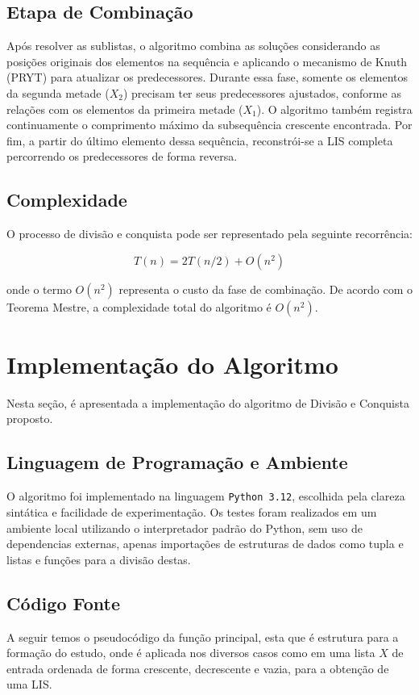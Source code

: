\documentclass[por]{ajceam-class}
\begin{document}
\subsection{Etapa de Combinação}

Após resolver as sublistas, o algoritmo combina as soluções considerando as posições originais dos elementos na sequência e aplicando o mecanismo de Knuth (PRYT) para atualizar os predecessores.  
Durante essa fase, somente os elementos da segunda metade ($X_2$) precisam ter seus predecessores ajustados, conforme as relações com os elementos da primeira metade ($X_1$).  
O algoritmo também registra continuamente o comprimento máximo da subsequência crescente encontrada.  
Por fim, a partir do último elemento dessa sequência, reconstrói-se a LIS completa percorrendo os predecessores de forma reversa.

\subsection{Complexidade}

O processo de divisão e conquista pode ser representado pela seguinte recorrência:

\[
T(n) = 2T(n/2) + O(n^2)
\]

onde o termo $O(n^2)$ representa o custo da fase de combinação.  
De acordo com o Teorema Mestre, a complexidade total do algoritmo é $O(n^2)$.


\section{Implementação do Algoritmo}
\label{sec:implementacao}
Nesta seção, é apresentada a implementação do algoritmo de Divisão e Conquista proposto.

\subsection{Linguagem de Programação e Ambiente}
O algoritmo foi implementado na linguagem \texttt{Python 3.12}, escolhida pela clareza sintática e facilidade de experimentação.  
Os testes foram realizados em um ambiente local utilizando o interpretador padrão do Python, sem uso de dependencias externas, apenas importações de estruturas de dados como tupla e listas e funções para a divisão destas.

\subsection{Código Fonte}
A seguir temos o pseudocódigo da função principal, esta que é estrutura para a formação do estudo, onde é aplicada nos diversos casos como em uma lista $X$ de entrada ordenada de forma crescente, decrescente e vazia, para a obtenção de uma LIS.
\end{document}
